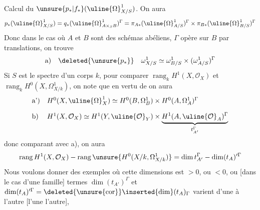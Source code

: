Calcul du $\unsure{p_*|f_*}(\uline{\Omega}^1_{X/S})$. On aura
\[
p_*(\uline{\Omega}^1_{X/S})=q_*(\uline{\Omega}^1_{A\times_S B})^{\Gamma}=\pi_{A*}(\uline{\Omega}^1_{A/S})^{\Gamma}\times\pi_{B*}(\uline{\Omega}^1_{B/S})^{\Gamma}
\]
Donc dans le cas  où $A$ et $B$ sont des schémas abéliens,  $\Gamma$ opère sur $B$ par translations, on trouve
\[
\text{a)}\quad\deleted{\unsure{p_*}}\quad\omega^1_{X/S}\simeq\omega^1_{B/S}\times(\omega^1_{A/S})^{\Gamma}
\]
Si $S$ est le spectre d'un corps $k$, pour comparer $\operatorname{rang}_k H^1(X,\mathcal O_X)$ et $\operatorname{rang}_k H^0(X,\Omega^1_{X/k})$, on note  que en vertu de \unsure{$(*)$} on aura
\[
\begin{array}{ll}
\text{a')} &H^0(X,\uline{\Omega}^1_X)\simeq H^0(B,\Omega^1_B)\times H^0(A,\Omega^1_A)^{\Gamma}\\[1em]
\text{b)} &H^1(X,\mathcal O_X)\simeq H^1(Y,\uline{\mathcal O}_Y)\times\underbrace{H^1(A,\uline{\mathcal O}_A)^{\Gamma}}_{t_{A'}^{\Gamma}}
\end{array}
\]
donc comparant avec a), on aura
\[
\operatorname{rang}H^1(X,\mathcal O_X)-\operatorname{rang}\unsure{H^0(X/k,\Omega^1_{X/k})}=\dim t_{A'}^{\Gamma}-\dim(t_A)'^{\Gamma}
\]
Nous voulons donner des exemples où cette  dimensions est $>0$, ou $<0$,  ou [dans le cas d'une famille]  termes  $\dim(t_{A'})^{\Gamma}$ et $\dim(t_A)'^{\Gamma}=\deleted{\unsure{\operatorname{cor}}}\inserted{\dim}(t_A)_{\Gamma}$ varient d'une  à l'autre \deleted{[\unsure{par un}} [l'une  l'autre],
